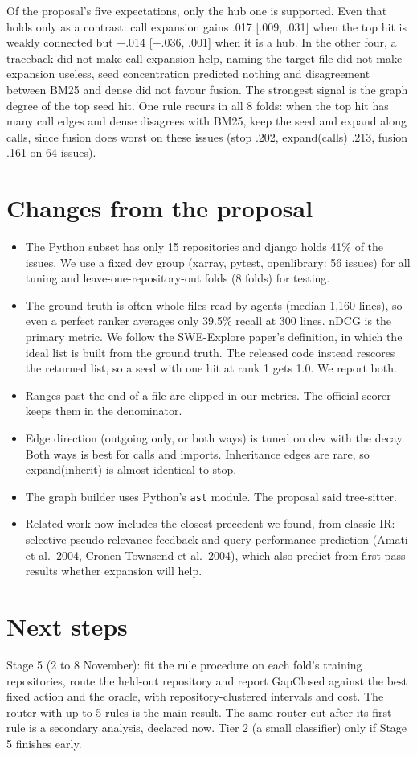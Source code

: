 \documentclass[10pt,a4paper,twocolumn]{article}
\begin{document}
Of the proposal's five expectations, only the hub one is supported. Even that
holds only as a contrast: call expansion gains .017 [.009, .031] when the top hit is
weakly connected but $-$.014 [$-$.036, .001] when it is a hub. In the other four, a
traceback did not make call expansion help, naming the target file did not
make expansion useless, seed concentration predicted nothing and
disagreement between BM25 and dense did not favour fusion. The strongest
signal is the graph degree of the top seed hit. One rule recurs in all 8
folds: when the top hit has many call edges and dense disagrees with BM25,
keep the seed and expand along calls, since fusion does worst on these
issues (stop .202, expand(calls) .213, fusion .161 on 64 issues).

\section{Changes from the proposal}
\begin{itemize}
\item The Python subset has only 15 repositories and django holds 41\% of
the issues. We use a
fixed dev group (xarray, pytest, openlibrary: 56 issues) for all tuning and
leave-one-repository-out folds (8 folds) for testing.
\item The ground truth is often whole files read by agents (median 1,160
lines), so even a perfect ranker averages only 39.5\% recall at 300 lines.
nDCG is the primary metric. We follow the SWE-Explore paper's definition,
in which the ideal list is built from the ground truth. The released code
instead rescores the returned list, so a seed with one hit at rank 1 gets
1.0. We report both.
\item Ranges past the end of a file are clipped in our metrics. The official
scorer keeps them in the denominator.
\item Edge direction (outgoing only, or both ways) is tuned on dev with the
decay. Both ways is best for calls and imports. Inheritance edges are rare,
so expand(inherit) is almost identical to stop.
\item The graph builder uses Python's \texttt{ast} module. The proposal said
tree-sitter.
\item Related work now includes the closest precedent we found, from classic
IR: selective pseudo-relevance feedback and query performance prediction
(Amati et al.\ 2004, Cronen-Townsend et al.\ 2004), which also predict from
first-pass results whether expansion will help.
\end{itemize}

\section{Next steps}
Stage 5 (2 to 8 November): fit the rule procedure on each fold's training
repositories, route the held-out repository and report GapClosed against
the best fixed action and the oracle, with repository-clustered intervals and
cost. The router with up to 5 rules is the main result. The same router cut
after its first rule is a secondary analysis, declared now. Tier 2 (a small
classifier) only if Stage 5 finishes early.
\end{document}
